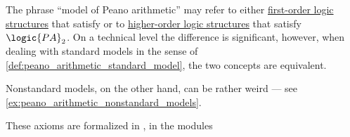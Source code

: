 \begin{comments}
  \item The phrase \enquote{model of Peano arithmetic} may refer to either \hyperref[def:fol_structure]{first-order logic structures} that satisfy  or to \hyperref[def:hol_structure]{higher-order logic structures} that satisfy \( \logic{PA}_2 \). On a technical level the difference is significant, however, when dealing with standard models in the sense of \cref{def:peano_arithmetic_standard_model}, the two concepts are equivalent.

  Nonstandard models, on the other hand, can be rather weird --- see \cref{ex:peano_arithmetic_nonstandard_models}.

  \item These axioms are formalized in \cite{notebook:code}, in the modules
  \begin{CodeRefDisplay}
     \\
  \end{CodeRefDisplay}
\end{comments}

